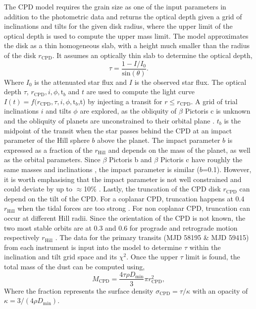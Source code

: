 \documentclass{aa}
\newcommand\picb{$\beta$ Pictoris b}
\newcommand\picc{$\beta$ Pictoris c}
\begin{document}
	The CPD model requires the grain size as one of the input parameters in addition to the photometric data and returns the optical depth given a grid of inclinations and tilts for the given disk radius, where the upper limit of the optical depth is used to compute the upper mass limit. 
	The model approximates the disk as a thin homogeneous slab, with a height much smaller than the radius of the disk $r_{\text{CPD}}$. 
	It assumes an optically thin slab to determine the optical depth,
	\begin{equation} 
		\tau = \frac{1-I/I_0}{\text{sin}(\theta)}.
	\end{equation} 
	Where $I_0$ is the attenuated star flux and $I$ is the observed star flux. 
	The optical depth $\tau$, $r_{\text{CPD}},i,\phi,\text{t}_b$ and $t$ are used to compute the light curve $I(t)=f(r_{\text{CPD}},\tau,i,\phi,\text{t}_b$,t) by injecting a transit for $r \leq r_{\text{CPD}}$. 
	A grid of trial inclinations $i$ and tilts $\phi$ are explored, as the obliquity of \picc{} is unknown and the obliquity of planets are unconstrained to their orbital plane \citep{Laskar_1993, Kenworthy_2021}.  
	$t_b$ is the midpoint of the transit when the star passes behind the CPD at an impact parameter of the Hill sphere $b$ above the planet.
	The impact parameter $b$ is expressed as a fraction of the $r_{\text{Hill}}$ and depends on the mass of the planet, as well as the orbital parameters.  
	Since \picb{} and \picc{} have roughly the same masses and inclinations \citep{Kenworthy_2021}, the impact parameter is similar ($b$=0.1).  
	However, it is worth emphasising that the impact parameter is not well constrained and could deviate by up to $\approx$10\% \citep[e.g.][]{Wang_2016,Lagrange_2019,Nielsen_2020}.  
	Lastly, the truncation of the CPD disk $r_{\text{CPD}}$ can depend on the tilt of the CPD.
	For a coplanar CPD, truncation happens at 0.4 $r_{\text{Hill}}$ when the tidal forces are too strong \citep{Martin_2011}.  
	For non coplanar CPD, truncation can occur at different Hill radii.  
	Since the orientation of the CPD is not known, the two most stable orbits are at 0.3 and 0.6 for prograde and retrograde motion respectively $r_{\text{Hill}}$ \citep{Lubow_2015, Miranda_2015}. 
	The data for the primary transits (MJD 58195 \& MJD 59415) from each instrument is input into the model to determine $\tau$ within the inclination and tilt grid space and its $\chi^2$. 
	Once the upper $\tau$ limit is found, the total mass of the dust can be computed using, 
	\begin{equation}
		M_{\text{CPD}} = \frac{4 \tau \rho D_{\text{min}} }{3} \pi r_{\text{CPD}}^2,
		\label{eq:mass_limit}
	\end{equation} 
	Where the fraction represents the surface density $\sigma_{\text{CPD}} = \tau / \kappa$ with an opacity of $\kappa = 3/(4 \rho D_{\text{min}})$. 
	
\end{document}
